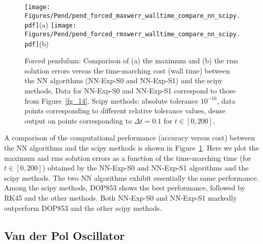 \begin{figure}
  \centerline{
    \texttt{[image: Figures/Pend/pend\_forced\_maxwerr\_walltime\_compare\_nn\_scipy.pdf]}(a)
    \texttt{[image: Figures/Pend/pend\_forced\_rmswerr\_walltime\_compare\_nn\_scipy.pdf]}(b)
  }
  \caption{Forced pendulum:
    Comparison of (a) the maximum and (b) the rms solution errors versus the time-marching
    cost (wall time) between the NN algorithms (NN-Exp-S0 and NN-Exp-S1)
    and the scipy methods.
    Data for NN-Exp-S0 and NN-Exp-S1 correspond to those from Figure~\ref{fg_14}.
    Scipy methods: absolute tolerance $10^{-16}$,
    data points corresponding to different relative tolerance values,
    dense output on points corresponding to $\Delta t=0.1$
    for $t\in[0,200]$.
  }
  \label{fg_15}
\end{figure}

A comparison of the computational performance (accuracy versus cost)
between the NN algorithms and the scipy methods is shown in Figure~\ref{fg_15}.
Here we plot the maximum and rms solution errors as a function of
the time-marching time (for $t\in[0,200]$) obtained by the NN-Exp-S0 and NN-Exp-S1
algorithms and the scipy methods.
The two NN algorithms exhibit essentially the same performance.
Among the scipy methods, DOP853 shows the best performance,  followed
by RK45 and the other methods. Both NN-Exp-S0 and NN-Exp-S1 markedly outperform DOP853 and the
other scipy methods.





\subsection{Van der Pol Oscillator}
\label{sec_vdp}


